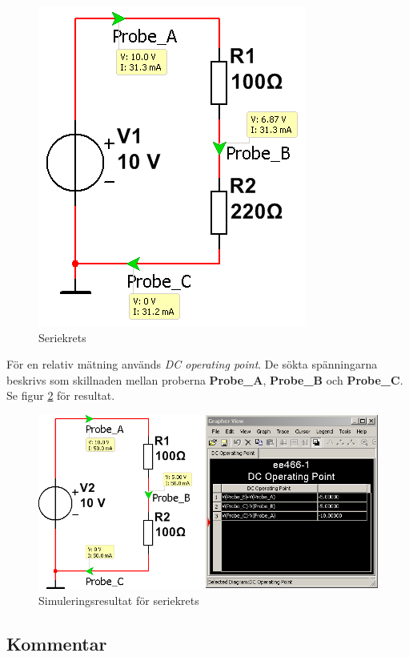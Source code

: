 \documentclass[11pt,a4paper]{article}
\begin{document}
\begin{figure}[htbp]
    \centering
    \includegraphics[scale=0.5]{ee466multisim/1.png}
    \caption{Seriekrets}
    \label{fig:sim2}
\end{figure}

För en relativ mätning används \emph{DC operating point}. De sökta spänningarna
beskrivs som skillnaden mellan proberna \textbf{Probe\_A}, \textbf{Probe\_B} och
\textbf{Probe\_C}. Se figur \ref{fig:sim2op} för resultat.

\begin{figure}[htbp]
    \centering
    \includegraphics[scale=0.5]{ee466multisim/1-op.png}
    \caption{Simuleringsresultat för seriekrets}
    \label{fig:sim2op}
\end{figure}


\subsection{Kommentar}\label{}
\end{document}
